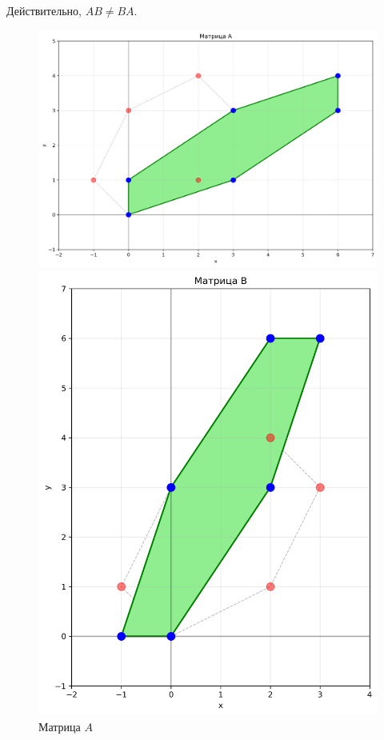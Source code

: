 Действительно, $AB \neq BA$.

\begin{figure}[h]
\centering
\begin{minipage}{0.23\textwidth}
\centering
\includegraphics[width=\textwidth]{images/task1/matrix_A.png}
\caption{Матрица $A$}
\label{fig:matrix_A}
\end{minipage}
\hfill
\begin{minipage}{0.23\textwidth}
\centering
\includegraphics[width=\textwidth]{images/task1/matrix_B.png}

\end{minipage}
\end{figure}

